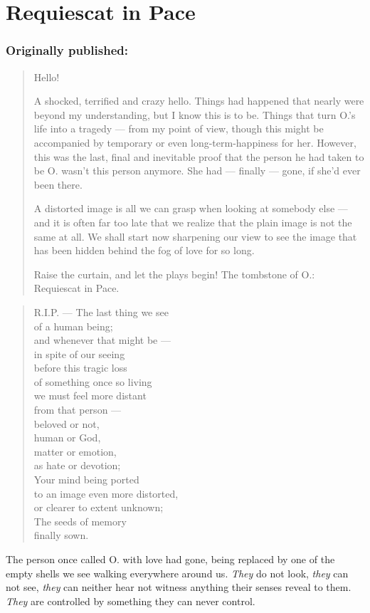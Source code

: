 \chapter{Requiescat in Pace}
\label{cha:requiescat-in-pace}
\subsection*{Originally published: }
\begin{quote}
Hello! 

A shocked, terrified and crazy hello. Things had happened that nearly were beyond my understanding, but I know this is to be. Things that turn O.'s life into a tragedy --- from my point of view, though this might be accompanied by temporary or even long-term-happiness for her. However, this was the last, final and inevitable proof that the person he had taken to be O. wasn't this person anymore. She had --- finally --- gone, if she'd ever been there.

A distorted image is all we can grasp when looking at somebody else --- and it is often far too late that we realize that the plain image is not the same at all. 
We shall start now sharpening our view to see the image that has been hidden behind the fog of love for so long.

Raise the curtain, and let the plays begin! The tombstone of O.: Requiescat in Pace.
\end{quote}

\begin{quote}
R.I.P. --- The last thing we see \\
of a human being; \\
and whenever that might be --- \\
in spite of our seeing \\
before this tragic loss \\
of something once so living \\
we must feel more distant \\
from that person --- \\
beloved or not, \\
human or God, \\
matter or emotion, \\
as hate or devotion; \\
Your mind being ported \\
to an image even more distorted, \\
or clearer to extent unknown; \\
The seeds of memory \\
finally sown.   
\end{quote}
The person once called O. with love had gone, being replaced by one of the empty shells we see walking everywhere around us. \emph{They} do not look, \emph{they} can not see, \emph{they} can neither hear not witness anything their senses reveal to them. \emph{They} are controlled by something they can never control.

